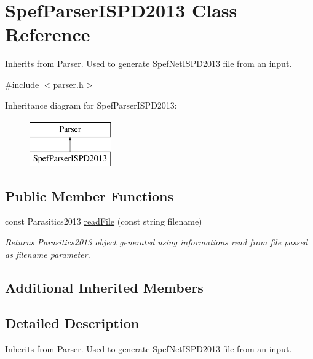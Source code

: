 \hypertarget{classSpefParserISPD2013}{\section{Spef\-Parser\-I\-S\-P\-D2013 Class Reference}
\label{classSpefParserISPD2013}
}


Inherits from \hyperlink{classParser}{Parser}. Used to generate \hyperlink{classSpefNetISPD2013}{Spef\-Net\-I\-S\-P\-D2013} file from an input.  




{\ttfamily \#include $<$parser.\-h$>$}

Inheritance diagram for Spef\-Parser\-I\-S\-P\-D2013\-:\begin{figure}[H]
\begin{center}
\leavevmode
\includegraphics[height=2.000000cm]{classSpefParserISPD2013}
\end{center}
\end{figure}
\subsection*{Public Member Functions}
\begin{DoxyCompactItemize}
\item 
const Parasitics2013 \hyperlink{classSpefParserISPD2013_a11c71d121883895a367a99b052aada73}{read\-File} (const string filename)
\begin{DoxyCompactList}\small\item\em Returns Parasitics2013 object generated using informations read from file passed as filename parameter. \end{DoxyCompactList}\end{DoxyCompactItemize}
\subsection*{Additional Inherited Members}


\subsection{Detailed Description}
Inherits from \hyperlink{classParser}{Parser}. Used to generate \hyperlink{classSpefNetISPD2013}{Spef\-Net\-I\-S\-P\-D2013} file from an input. 

